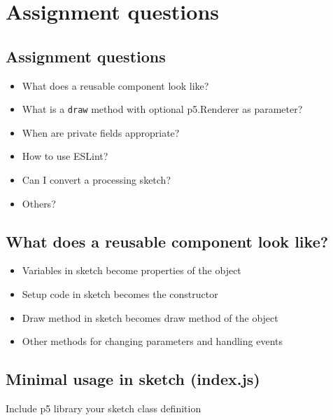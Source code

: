 \documentclass[]{article}
\date{}
\providecommand{\tightlist}{%
  \setlength{\itemsep}{0pt}\setlength{\parskip}{0pt}}
\begin{document}
\hypertarget{assignment-questions}{%
\section{Assignment questions}\label{assignment-questions}}

\hypertarget{assignment-questions-1}{%
\subsection{Assignment questions}\label{assignment-questions-1}}

\begin{itemize}
\tightlist
\item
  What does a reusable component look like?
\item
  What is a \texttt{draw} method with optional p5.Renderer as parameter?
\item
  When are private fields appropriate?
\item
  How to use ESLint?
\item
  Can I convert a processing sketch?
\item
  Others?
\end{itemize}

\hypertarget{what-does-a-reusable-component-look-like}{%
\subsection{What does a reusable component look
like?}\label{what-does-a-reusable-component-look-like}}

\begin{itemize}
\tightlist
\item
  Variables in sketch become properties of the object
\item
  Setup code in sketch becomes the constructor
\item
  Draw method in sketch becomes draw method of the object
\item
  Other methods for changing parameters and handling events
\end{itemize}

\hypertarget{minimal-usage-in-sketch-index.js}{%
\subsection{Minimal usage in sketch
(index.js)}\label{minimal-usage-in-sketch-index.js}}

Include p5 library your sketch class definition
\end{document}
